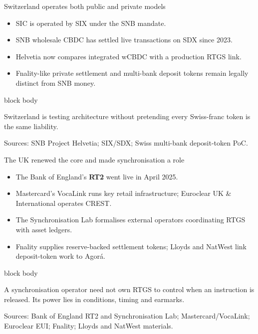 \documentclass[aspectratio=169,12pt]{beamer}
\newcommand{\rust}[1]{\textcolor{Rust}{\textbf{#1}}}
\newcommand{\source}[1]{\vfill\par\fontsize{5.4}{6.5}\selectfont\color{Quiet}Sources: #1}
\newcommand{\tightitems}{\setlength{\itemsep}{0.42em}\setlength{\parskip}{0pt}}
\newenvironment{statement}{%
  \begin{beamercolorbox}[sep=.18cm,rounded=false,wd=\linewidth]{block body}%
  \fontsize{13}{15.5}\selectfont\bfseries
}{\end{beamercolorbox}}
\begin{document}
\begin{frame}{Switzerland operates both public and private models}
  \begin{itemize}\tightitems
    \item SIC is operated by SIX under the SNB mandate.
    \item SNB wholesale CBDC has settled live transactions on SDX since 2023.
    \item Helvetia now compares integrated wCBDC with a production RTGS link.
    \item Fnality-like private settlement and multi-bank deposit tokens remain legally distinct from SNB money.
  \end{itemize}
  \begin{statement}
    Switzerland is testing architecture without pretending every Swiss-franc token is the same liability.
  \end{statement}
  \source{SNB Project Helvetia; SIX/SDX; Swiss multi-bank deposit-token PoC.}
\end{frame}

\begin{frame}{The UK renewed the core and made synchronisation a role}
  \begin{itemize}\tightitems
    \item The Bank of England's \rust{RT2} went live in April 2025.
    \item Mastercard's VocaLink runs key retail infrastructure; Euroclear UK \& International operates CREST.
    \item The Synchronisation Lab formalises external operators coordinating RTGS with asset ledgers.
    \item Fnality supplies reserve-backed settlement tokens; Lloyds and NatWest link deposit-token work to Agor\'a.
  \end{itemize}
  \begin{statement}
    A synchronisation operator need not own RTGS to control when an instruction is released. Its power lies in conditions, timing and earmarks.
  \end{statement}
  \source{Bank of England RT2 and Synchronisation Lab; Mastercard/VocaLink; Euroclear EUI; Fnality; Lloyds and NatWest materials.}
\end{frame}
\end{document}
